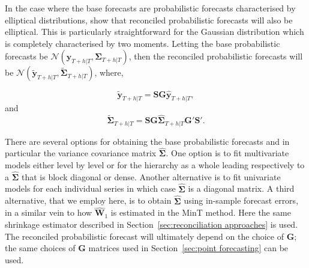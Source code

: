 \documentclass[graybox]{svmult}
\begin{document}

In the case where the base forecasts are probabilistic forecasts characterised by elliptical distributions, \cite{GamEtAl2018} show that reconciled probabilistic forecasts will also be elliptical.  This is particularly straightforward for the Gaussian distribution which is completely characterised by two moments.  Letting the base probabilistic forecasts be $\mathscr{N}(\bm{\hat{y}}_{T+h|T}, \hat{\bm{\Sigma}}_{T+h|T})$, then the reconciled probabilistic forecasts will be $\mathscr{N}(\bm{\tilde{y}}_{T+h|T}, \tilde{\bm{\Sigma}}_{T+h|T})$, where,

\begin{equation}\label{eq:rec mean}
\bm{\tilde{y}}_{T+h|T} = \bm{SG}\bm{\hat{y}}_{T+h|T},
\end{equation}
and
\begin{equation}\label{eq:rec var}
\tilde{\bm{\Sigma}}_{T+h|T} = \bm{SG}\hat{\bm{\Sigma}}_{T+h|T}\bm{G'S'}.
\end{equation}

There are several options for obtaining the base probabilistic forecasts and in particular the variance covariance matrix $\hat{\bm{\Sigma}}$.  One option is to fit multivariate models either level by level or for the hierarchy as a whole leading respectively to a $\hat{\bm \Sigma}$ that is block diagonal or dense.  Another alternative is to fit univariate models for each individual series in which case $\hat{\bm{\Sigma}}$ is a diagonal matrix. A third alternative, that we employ here, is to obtain $\hat{\bm{\Sigma}}$ using in-sample forecast errors, in a similar vein to how $\hat{\bm{W}}_{1}$ is estimated in the MinT method.  Here the same shrinkage estimator described in Section~\ref{sec:reconciliation approaches} is used.  The reconciled probabilistic forecast will ultimately depend on the choice of $\bm{G}$; the same choices of $\bm{G}$ matrices used in Section~\ref{sec:point forecasting} can be used.
\end{document}
